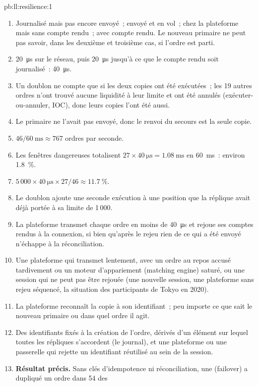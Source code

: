 \begin{solution}{pb:ll:resilience:1}
\begin{enumerate}
\item Journalisé mais pas encore envoyé~; envoyé et en vol~; chez la plateforme mais sans compte rendu~; avec compte rendu. Le nouveau primaire ne peut pas savoir,
dans les deuxième et troisième cas, si l'ordre est parti.
\item \qty{20}{\micro\second} sur le réseau, puis \qty{20}{\micro\second} jusqu'à ce que le compte rendu soit journalisé~: \qty{40}{\micro\second}.
\item Un doublon ne compte que si les deux copies ont été exécutées~; les 19 autres ordres n'ont trouvé aucune liquidité à leur limite et ont été
annulés (exécuter-ou-annuler, IOC), donc leurs copies l'ont été aussi.
\item Le primaire ne l'avait pas envoyé, donc le renvoi du secours est la seule copie.
\item $46 / \qty{60}{\milli\second} \approx 767$ ordres par seconde.
\item Les fenêtres dangereuses totalisent $27 \times \qty{40}{\micro\second} = \qty{1.08}{\milli\second}$ en
\qty{60}{\milli\second}~: environ 1.8~\%.
\item $5\,000 \times \qty{40}{\micro\second} \times 27/46 \approx 11.7~\%$.
\item Le doublon ajoute une seconde exécution à une position que la réplique avait déjà portée à sa limite de 1\,000.
\item La plateforme transmet chaque ordre en moins de \qty{40}{\micro\second} et rejoue ses comptes rendus à la connexion, si bien qu'après le rejeu
rien de ce qui a été envoyé n'échappe à la réconciliation.
\item Une plateforme qui transmet lentement, avec un ordre au repos accusé tardivement ou un moteur d'appariement (matching engine) saturé, ou une session qui ne peut pas
être rejouée (une nouvelle session, une plateforme sans rejeu séquencé, la situation des participants de Tokyo en 2020).
\item La plateforme reconnaît la copie à son identifiant~; peu importe ce que sait le nouveau primaire ou dans quel ordre il agit.
\item Des identifiants fixés à la création de l'ordre, dérivés d'un élément sur lequel toutes les répliques s'accordent (le journal), et une plateforme
ou une passerelle qui rejette un identifiant réutilisé au sein de la session.
\item \textbf{Résultat précis.} Sans clés d'idempotence ni réconciliation, une  (failover) a dupliqué un ordre dans 54 des

\end{enumerate}
\end{solution}
